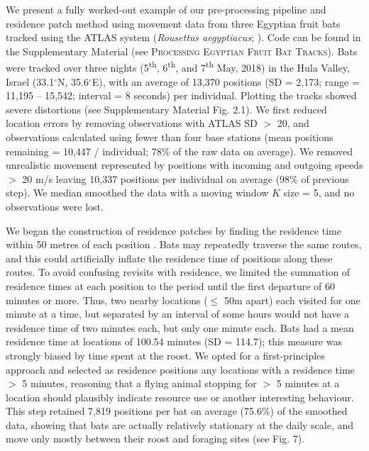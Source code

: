 \documentclass[10pt,paper=a4,headings=standardclasses
]{scrartcl}
\begin{document}
We present a fully worked-out example of our pre-processing pipeline and residence patch method using movement data from three Egyptian fruit bats tracked using the ATLAS system (\textit{Rousettus aegyptiacus}; \citet{toledo2020}).
Code can be found in the Supplementary Material (see \textsc{Processing Egyptian Fruit Bat Tracks}).
Bats were tracked over three nights (5\textsuperscript{th}, 6\textsuperscript{th}, and 7\textsuperscript{th} May, 2018) in the Hula Valley, Israel (33.1$^{\circ}$N, 35.6$^{\circ}$E), with an average of 13,370 positions (SD = 2,173; range = 11,195 -- 15,542; interval = 8 seconds) per individual.
Plotting the tracks showed severe distortions (see Supplementary Material Fig. 2.1).
We first reduced location errors by removing observations with ATLAS SD $>$ 20, and observations calculated using fewer than four base stations (mean positions remaining = 10,447 / individual; 78\% of the raw data on average).
We removed unrealistic movement represented by positions with incoming and outgoing speeds $>$ 20 m/s leaving 10,337 positions per individual on average (98\% of previous step).
We median smoothed the data with a moving window $K$ size = 5, and no observations were lost.

We began the construction of residence patches by finding the residence time within 50 metres of each position \citep{bracis2018}.
Bats may repeatedly traverse the same routes, and this could artificially inflate the residence time of positions along these routes.
To avoid confusing revisits with residence, we limited the summation of residence times at each position to the period until the first departure of 60 minutes or more.
Thus, two nearby locations ($\leq$ 50m apart) each visited for one minute at a time, but separated by an interval of some hours would not have a residence time of two minutes each, but only one minute each.
Bats had a mean residence time at locations of 100.54 minutes (SD = 114.7); this measure was strongly biased by time spent at the roost.
We opted for a first-principles approach and selected as residence positions any locations with a residence time $>$ 5 minutes, reasoning that a flying animal stopping for $>$ 5 minutes at a location should plausibly indicate resource use or another interesting behaviour.
This step retained 7,819 positions per bat on average (75.6\%) of the smoothed data, showing that bats are actually relatively stationary at the daily scale, and move only mostly between their roost and foraging sites (see Fig. 7).
\end{document}
